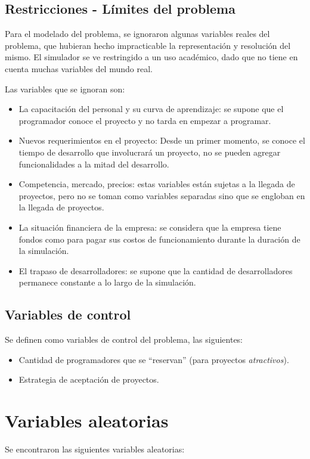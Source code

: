 \subsection{Restricciones - Límites del problema}

Para el modelado del problema, se ignoraron algunas variables reales del problema, que hubieran hecho impracticable la representación y resolución del mismo. El simulador se ve 
restringido a un uso académico, dado que no tiene en cuenta muchas variables del mundo real.

Las variables que se ignoran son: \\

\begin{itemize}
    \item La capacitación del personal y su curva de aprendizaje: se supone que el programador conoce el proyecto y no tarda en empezar a programar.
    \item Nuevos requerimientos en el proyecto: Desde un primer momento, se conoce el tiempo de desarrollo que involucrará un proyecto, no se pueden agregar 
            funcionalidades a la mitad del desarrollo.
    \item Competencia, mercado, precios: estas variables están sujetas a la llegada de proyectos, pero no se toman como variables separadas sino que se engloban en la 
        llegada de proyectos.
    \item La situación financiera de la empresa: se considera que la empresa tiene fondos como para pagar sus costos de funcionamiento durante la duración de la simulación.
    \item El trapaso de desarrolladores: se supone que la cantidad de desarrolladores permanece constante a lo largo de la simulación.
\end{itemize}

\subsection{Variables de control}
Se definen como variables de control del problema, las siguientes:

\begin{itemize}
    \item Cantidad de programadores que se ``reservan'' (para proyectos \textit{atractivos}).
    \item Estrategia de aceptación de proyectos.
\end{itemize}

\section{Variables aleatorias}
Se encontraron las siguientes variables aleatorias:

